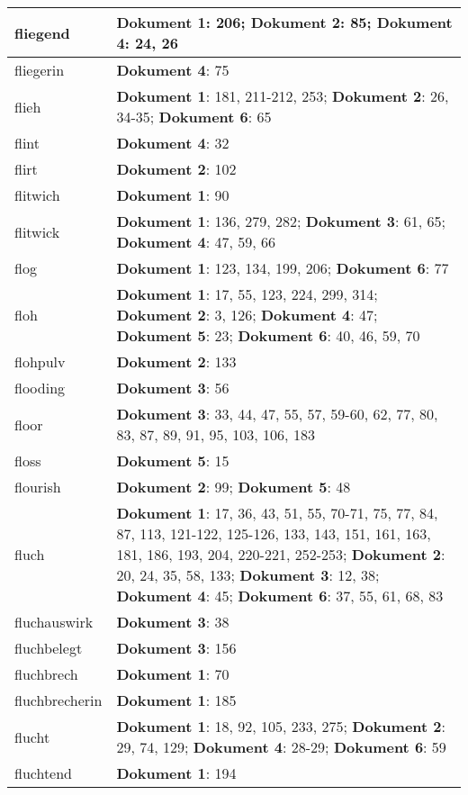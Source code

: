 \documentclass[a5paper]{article}
\begin{document}
\begin{longtable}[l]{|l|p{3in}|}
\hline
fliegend & \textbf{Dokument 1}: 206; \textbf{Dokument 2}: 85; \textbf{Dokument 4}: 24, 26 \\
\hline
fliegerin & \textbf{Dokument 4}: 75 \\
\hline
flieh & \textbf{Dokument 1}: 181, 211-212, 253; \textbf{Dokument 2}: 26, 34-35; \textbf{Dokument 6}: 65 \\
\hline
flint & \textbf{Dokument 4}: 32 \\
\hline
flirt & \textbf{Dokument 2}: 102 \\
\hline
flitwich & \textbf{Dokument 1}: 90 \\
\hline
flitwick & \textbf{Dokument 1}: 136, 279, 282; \textbf{Dokument 3}: 61, 65; \textbf{Dokument 4}: 47, 59, 66 \\
\hline
flog & \textbf{Dokument 1}: 123, 134, 199, 206; \textbf{Dokument 6}: 77 \\
\hline
floh & \textbf{Dokument 1}: 17, 55, 123, 224, 299, 314; \textbf{Dokument 2}: 3, 126; \textbf{Dokument 4}: 47; \textbf{Dokument 5}: 23; \textbf{Dokument 6}: 40, 46, 59, 70 \\
\hline
flohpulv & \textbf{Dokument 2}: 133 \\
\hline
flooding & \textbf{Dokument 3}: 56 \\
\hline
floor & \textbf{Dokument 3}: 33, 44, 47, 55, 57, 59-60, 62, 77, 80, 83, 87, 89, 91, 95, 103, 106, 183 \\
\hline
floss & \textbf{Dokument 5}: 15 \\
\hline
flourish & \textbf{Dokument 2}: 99; \textbf{Dokument 5}: 48 \\
\hline
fluch & \textbf{Dokument 1}: 17, 36, 43, 51, 55, 70-71, 75, 77, 84, 87, 113, 121-122, 125-126, 133, 143, 151, 161, 163, 181, 186, 193, 204, 220-221, 252-253; \textbf{Dokument 2}: 20, 24, 35, 58, 133; \textbf{Dokument 3}: 12, 38; \textbf{Dokument 4}: 45; \textbf{Dokument 6}: 37, 55, 61, 68, 83 \\
\hline
fluchauswirk & \textbf{Dokument 3}: 38 \\
\hline
fluchbelegt & \textbf{Dokument 3}: 156 \\
\hline
fluchbrech & \textbf{Dokument 1}: 70 \\
\hline
fluchbrecherin & \textbf{Dokument 1}: 185 \\
\hline
flucht & \textbf{Dokument 1}: 18, 92, 105, 233, 275; \textbf{Dokument 2}: 29, 74, 129; \textbf{Dokument 4}: 28-29; \textbf{Dokument 6}: 59 \\
\hline
fluchtend & \textbf{Dokument 1}: 194 \\

\end{longtable}
\end{document}

